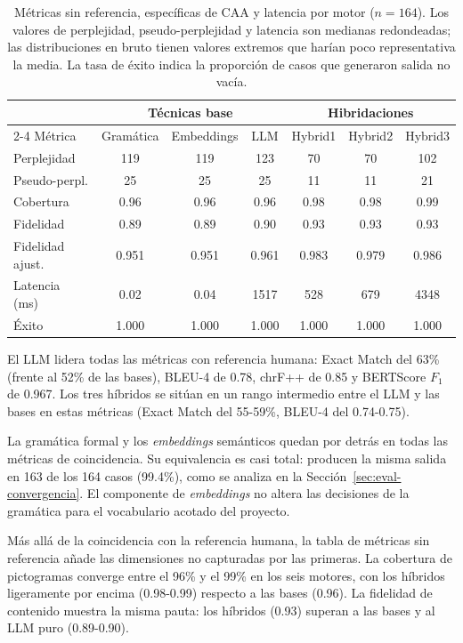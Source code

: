 \begin{table}[ht]
\centering
\small
\begin{tabular}{l c c c c c c}
\hline
 & \multicolumn{3}{c}{Técnicas base} & \multicolumn{3}{c}{Hibridaciones} \\
\cline{2-4} \cline{5-7}
Métrica & Gramática & Embeddings & LLM & Hybrid1 & Hybrid2 & Hybrid3 \\
\hline
Perplejidad & 119 & 119 & 123 & 70 & 70 & 102 \\
Pseudo-perpl. & 25 & 25 & 25 & 11 & 11 & 21 \\
Cobertura & 0.96 & 0.96 & 0.96 & 0.98 & 0.98 & 0.99 \\
Fidelidad & 0.89 & 0.89 & 0.90 & 0.93 & 0.93 & 0.93 \\
Fidelidad ajust. & 0.951 & 0.951 & 0.961 & 0.983 & 0.979 & 0.986 \\
Latencia (ms) & 0.02 & 0.04 & 1517 & 528 & 679 & 4348 \\
Éxito & 1.000 & 1.000 & 1.000 & 1.000 & 1.000 & 1.000 \\
\hline
\end{tabular}
\caption{Métricas sin referencia, específicas de CAA y latencia por motor ($n=164$). Los valores de perplejidad, pseudo-perplejidad y latencia son medianas redondeadas; las distribuciones en bruto tienen valores extremos que harían poco representativa la media. La tasa de éxito indica la proporción de casos que generaron salida no vacía.}
\label{tab:eval-sin-referencia}
\end{table}

El LLM lidera todas las métricas con referencia humana: Exact Match del 63\% (frente al 52\% de las bases), BLEU-4 de 0.78, chrF++ de 0.85 y BERTScore $F_1$ de 0.967. Los tres híbridos se sitúan en un rango intermedio entre el LLM y las bases en estas métricas (Exact Match del 55-59\%, BLEU-4 del 0.74-0.75).

La gramática formal y los \textit{embeddings} semánticos quedan por detrás en todas las métricas de coincidencia. Su equivalencia es casi total: producen la misma salida en 163 de los 164 casos (99.4\%), como se analiza en la Sección~\ref{sec:eval-convergencia}. El componente de \textit{embeddings} no altera las decisiones de la gramática para el vocabulario acotado del proyecto.

Más allá de la coincidencia con la referencia humana, la tabla de métricas sin referencia añade las dimensiones no capturadas por las primeras. La cobertura de pictogramas converge entre el 96\% y el 99\% en los seis motores, con los híbridos ligeramente por encima (0.98-0.99) respecto a las bases (0.96). La fidelidad de contenido muestra la misma pauta: los híbridos (0.93) superan a las bases y al LLM puro (0.89-0.90).

